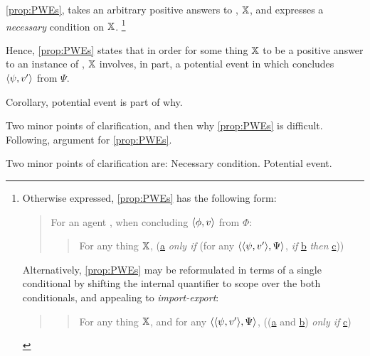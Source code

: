 \begin{note}
  \autoref{prop:PWEs}, takes an arbitrary positive answers to \qzS{}, \(\qzSaV{}\), and expresses a \emph{necessary} condition on \(\qzSaV{}\).%
  \footnote{
    Otherwise expressed, \autoref{prop:PWEs} has the following form:

    \begin{quote}
      For an agent \vAgent{}, when concluding \(\pv{\phi}{v}\) from \(\Phi\):
      \begin{quote}
        For any thing \(\qzSaV{}\), (\hyperref[prop:PWEs:a]{a} \emph{only if} (for any \(\pvp{\psi}{v'}{\Psi}\), \emph{if} \hyperref[prop:PWEs:b]{b} \emph{then} \hyperref[prop:PWEs:c]{c}))
      \end{quote}
    \end{quote}
    Alternatively, \autoref{prop:PWEs} may be reformulated in terms of a single conditional by shifting the internal quantifier to scope over the both conditionals, and appealing to \emph{import-export}:
    \begin{quote}
      \begin{quote}
        For any thing \(\qzSaV{}\), and for any \(\pvp{\psi}{v'}{\Psi}\), ((\hyperref[prop:PWEs:a]{a} and \hyperref[prop:PWEs:b]{b}) \emph{only if} \hyperref[prop:PWEs:c]{c})
      \end{quote}
    \end{quote}
  }

  Hence, \autoref{prop:PWEs} states that in order for some thing \(\qzSaV{}\) to be a positive answer to an instance of \qzS{}, \(\qzSaV{}\) involves, in part, a potential event in which \vAgent{} concludes \(\pv{\psi}{v'}\) from \(\Psi\).
\end{note}

\begin{note}
  Corollary, potential event is part of why.
\end{note}

\begin{note}
  Two minor points of clarification, and then why \autoref{prop:PWEs} is difficult.
  Following, argument for \autoref{prop:PWEs}.

  Two minor points of clarification are:
  Necessary condition.
  Potential event.
\end{note}

